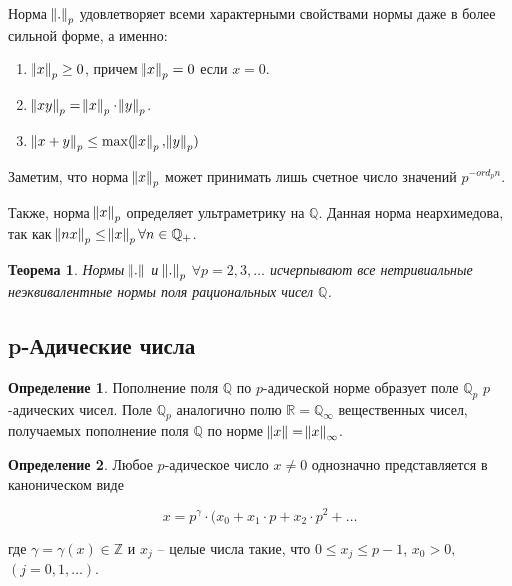 \documentclass[och, master]{SCWorks}
\theoremstyle{plain}
\newtheorem{thethm}{Теорема}
\theoremstyle{plain}
\theoremstyle{plain}
\theoremstyle{definition}
\newtheorem{defn}{Определение}
\begin{document}
Норма $\norm{.}_p$  удовлетворяет всеми характерными свойствами нормы даже в более сильной форме, а именно:

\begin{enumerate} 
	\item $\norm{x}_p \ge 0$, причем $\norm{x}_p = 0$ если $x = 0$.
	\item $\norm{xy}_p = \norm{x}_p \cdot \norm{y}_p$.
	\item $\norm{x + y}_p \le \max(\norm{x}_p, \norm{y}_p)$ \cite{bib:analysis:volovich}
\end{enumerate}

Заметим, что норма $\norm{x}_p$ может принимать лишь счетное число значений $p ^ {-ord_pn}$.

Также, норма $\norm{x}_p$ определяет ультраметрику на $\mathbb {Q}$. Данная норма неархимедова, так как $\norm{nx}_p \le \norm{x}_p \forall n \in \mathbb {Q}_{+}$.

\begin{thethm}
	Нормы $\norm{.}$ и $\norm{.}_p$ $\forall p = 2, 3, \dots$ исчерпывают все нетривиальные неэквивалентные нормы поля рациональных чисел $\mathbb {Q}$.
\end{thethm}


\subsection{p-Адические числа}

\begin{defn}
Пополнение поля $\mathbb {Q}$ по $p$-адической норме образует поле $\mathbb {Q}_p$ $p$-адических чисел. Поле $\mathbb {Q}_p$ аналогично полю $\mathbb {R} = \mathbb {Q}_{\infty}$ вещественных чисел, получаемых пополнение поля $\mathbb {Q}$ по норме $\norm{x}=\norm{x}_{\infty}$.
\end{defn}


\begin{defn}
Любое $p$-адическое число $x \ne 0$ однозначно представляется в каноническом виде

\begin{equation} \label{numbers:decomposition}
	x = p^{\gamma} \cdot (x_0 + x_1\cdot p + x_2 \cdot p^2 + \dots
\end{equation}

\noindent где $\gamma = \gamma(x) \in \mathbb {Z}$ и $x_j$ -- целые числа такие, что $0 \le x_j \le p-1$, $x_0 > 0,$ \linebreak $(j=0,1,\dots)$. 
\end{defn}
\end{document}
